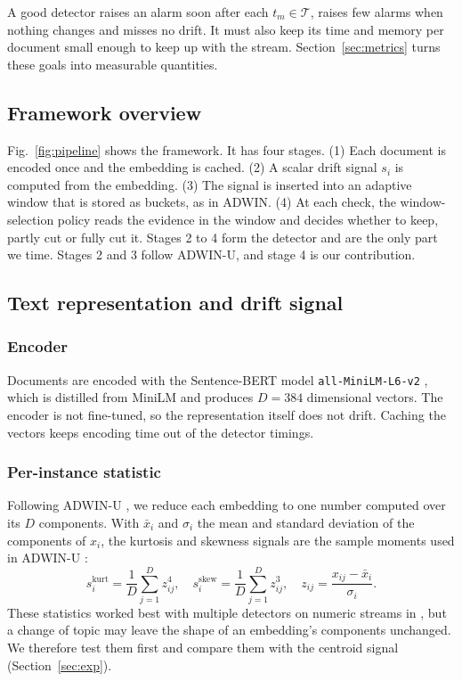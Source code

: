 \documentclass[conference]{IEEEtran}
\begin{document}
A good detector raises an alarm soon after each $t_m\in\mathcal{T}$, raises few alarms when nothing changes and misses no drift. It must also keep its time and memory per document small enough to keep up with the stream. Section~\ref{sec:metrics} turns these goals into measurable quantities.

\subsection{Framework overview}

Fig.~\ref{fig:pipeline} shows the framework. It has four stages. (1) Each document is encoded once and the embedding is cached. (2) A scalar drift signal $s_i$ is computed from the embedding. (3) The signal is inserted into an adaptive window that is stored as buckets, as in ADWIN. (4) At each check, the window-selection policy reads the evidence in the window and decides whether to keep, partly cut or fully cut it. Stages 2 to 4 form the detector and are the only part we time. Stages 2 and 3 follow ADWIN-U, and stage 4 is our contribution.

\subsection{Text representation and drift signal}

\subsubsection{Encoder}
Documents are encoded with the Sentence-BERT model \texttt{all-MiniLM-L6-v2} \cite{reimers2019}, which is distilled from MiniLM \cite{wang2020} and produces $D=384$ dimensional vectors. The encoder is not fine-tuned, so the representation itself does not drift. Caching the vectors keeps encoding time out of the detector timings.

\subsubsection{Per-instance statistic}
Following ADWIN-U \cite{assis2025}, we reduce each embedding to one number computed over its $D$ components. With $\bar x_i$ and $\sigma_i$ the mean and standard deviation of the components of $x_i$, the kurtosis and skewness signals are the sample moments used in ADWIN-U \cite{assis2025,joanes1998}:
\begin{equation}
s_i^{\mathrm{kurt}}=\frac{1}{D}\sum_{j=1}^{D}z_{ij}^{4},\quad
s_i^{\mathrm{skew}}=\frac{1}{D}\sum_{j=1}^{D}z_{ij}^{3},\quad
z_{ij}=\frac{x_{ij}-\bar x_i}{\sigma_i}.
\label{eq:stat}
\end{equation}
These statistics worked best with multiple detectors on numeric streams in \cite{assis2025}, but a change of topic may leave the shape of an embedding's components unchanged. We therefore test them first and compare them with the centroid signal (Section~\ref{sec:exp}).
\end{document}
